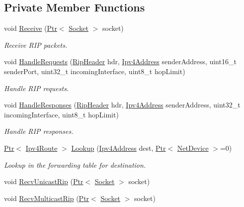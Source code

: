 \subsection*{Private Member Functions}
\begin{DoxyCompactItemize}
\item 
void \hyperlink{classns3_1_1Rip_a49acadfb3b533118276481a0d231406e}{Receive} (\hyperlink{classns3_1_1Ptr}{Ptr}$<$ \hyperlink{classns3_1_1Socket}{Socket} $>$ socket)
\begin{DoxyCompactList}\small\item\em Receive R\+IP packets. \end{DoxyCompactList}\item 
void \hyperlink{classns3_1_1Rip_a4094ed6c40c666f7567245eef2376fe9}{Handle\+Requests} (\hyperlink{classns3_1_1RipHeader}{Rip\+Header} hdr, \hyperlink{classns3_1_1Ipv4Address}{Ipv4\+Address} sender\+Address, uint16\+\_\+t sender\+Port, uint32\+\_\+t incoming\+Interface, uint8\+\_\+t hop\+Limit)
\begin{DoxyCompactList}\small\item\em Handle R\+IP requests. \end{DoxyCompactList}\item 
void \hyperlink{classns3_1_1Rip_afb817ee04f919351a35b466ea6d75c56}{Handle\+Responses} (\hyperlink{classns3_1_1RipHeader}{Rip\+Header} hdr, \hyperlink{classns3_1_1Ipv4Address}{Ipv4\+Address} sender\+Address, uint32\+\_\+t incoming\+Interface, uint8\+\_\+t hop\+Limit)
\begin{DoxyCompactList}\small\item\em Handle R\+IP responses. \end{DoxyCompactList}\item 
\hyperlink{classns3_1_1Ptr}{Ptr}$<$ \hyperlink{classns3_1_1Ipv4Route}{Ipv4\+Route} $>$ \hyperlink{classns3_1_1Rip_a50d486fb2eee757bb9f9d528d3828dab}{Lookup} (\hyperlink{classns3_1_1Ipv4Address}{Ipv4\+Address} dest, \hyperlink{classns3_1_1Ptr}{Ptr}$<$ \hyperlink{classns3_1_1NetDevice}{Net\+Device} $>$=0)
\begin{DoxyCompactList}\small\item\em Lookup in the forwarding table for destination. \end{DoxyCompactList}\item 
void \hyperlink{classns3_1_1Rip_a78791b61a720345a6d23e0d61e29002c}{Recv\+Unicast\+Rip} (\hyperlink{classns3_1_1Ptr}{Ptr}$<$ \hyperlink{classns3_1_1Socket}{Socket} $>$ socket)
\item 
void \hyperlink{classns3_1_1Rip_a4af37761c5e40fe5a5ddc0e61595d76d}{Recv\+Multicast\+Rip} (\hyperlink{classns3_1_1Ptr}{Ptr}$<$ \hyperlink{classns3_1_1Socket}{Socket} $>$ socket)

\end{DoxyCompactItemize}
